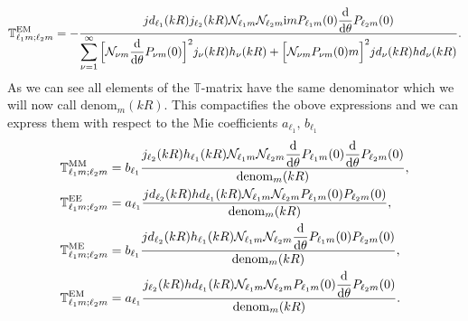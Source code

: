 \begin{equation}
\mathbb{T}^\mathrm{EM}_{\ell_1 m;\ell_2 m} = -
\frac{jd_{\ell_1}(kR) j_{\ell_2}(kR)
\mathcal{N}_{\ell_1 m}\mathcal{N}_{\ell_2 m}
\mathrm{i} mP_{\ell_1 m}(0)\dfrac{\mathrm{d}}{\mathrm{d} \theta}P_{\ell_2 m}(0)
}{\displaystyle \sum_{\nu=1}^\infty
\Big[
\mathcal{N}_{\nu m} \frac{\mathrm{d}}{\mathrm{d} \theta}P_{\nu m}(0)
\Big]^2 j_\nu(kR) h_\nu(kR)
+
\Big[
\mathcal{N}_{\nu m} P_{\nu m}(0) m
\Big]^2jd_\nu(kR) hd_\nu(kR)
}.
\end{equation}
As we can see all elements of the $\mathbb{T}$-matrix have the same denominator which we will now call $\mathrm{denom}_m(kR)$. This compactifies the obove expressions and we can express them with respect to the Mie coefficients $a_{\ell_1},\,b_{\ell_1}$
\begin{align}
\mathbb{T}^\mathrm{MM}_{\ell_1 m;\ell_2 m} &= b_{\ell_1} \frac{
j_{\ell_2}(kR)h_{\ell_1}(kR) \mathcal{N}_{\ell_1 m}\mathcal{N}_{\ell_2 m}
\dfrac{\mathrm{d}}{\mathrm{d} \theta}P_{\ell_1 m}(0)\dfrac{\mathrm{d}}{\mathrm{d} \theta} P_{\ell_2 m}(0)
}{
\mathrm{denom}_m(kR)
},\\
\mathbb{T}^\mathrm{EE}_{\ell_1 m;\ell_2 m} &= a_{\ell_1} \frac{
jd_{\ell_2}(kR)hd_{\ell_1}(kR) \mathcal{N}_{\ell_1 m}\mathcal{N}_{\ell_2 m}
P_{\ell_1 m}(0) P_{\ell_2 m}(0)
}{
\mathrm{denom}_m(kR)
},\\
\mathbb{T}^\mathrm{ME}_{\ell_1 m;\ell_2 m} &= b_{\ell_1} \frac{
jd_{\ell_2}(kR)h_{\ell_1}(kR) \mathcal{N}_{\ell_1 m}\mathcal{N}_{\ell_2 m}
\dfrac{\mathrm{d}}{\mathrm{d} \theta}P_{\ell_1 m}(0) P_{\ell_2 m}(0)
}{
\mathrm{denom}_m(kR)
},\\
\mathbb{T}^\mathrm{EM}_{\ell_1 m;\ell_2 m} &= a_{\ell_1} \frac{
j_{\ell_2}(kR)hd_{\ell_1}(kR) \mathcal{N}_{\ell_1 m}\mathcal{N}_{\ell_2 m}
P_{\ell_1 m}(0)\dfrac{\mathrm{d}}{\mathrm{d} \theta} P_{\ell_2 m}(0)
}{
\mathrm{denom}_m(kR)
}.
\end{align}